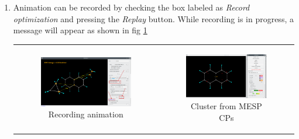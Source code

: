 \documentclass[10pt]{article}
\begin{document}
\begin{enumerate}
\item Animation can be recorded by checking the box labeled as
{\it Record optimization} and pressing the {\it Replay} button.
While recording is in progress, a message will appear as
shown in fig \ref{fig:A6_7}

\begin{center}
\begin{tabular}{cc}
\begin{minipage}{.48\linewidth}
\begin{figure}[H]
\begin{center}
\includegraphics[width=.8\linewidth]{damqt320_epic_7_b.png}
\end{center}
\caption{{Recording animation} \label{fig:A6_7}}
\end{figure}
\end{minipage}
&
\begin{minipage}{.48\linewidth}
\begin{figure}[H]
\begin{center}
\includegraphics[width=.8\linewidth]{damqt320_epic_8.png}
\end{center}
\caption{{Cluster from MESP CPs}\label{fig:A6_8}}
\end{figure}
\end{minipage}
\end{tabular}
\end{center}


\end{enumerate}
\end{document}
